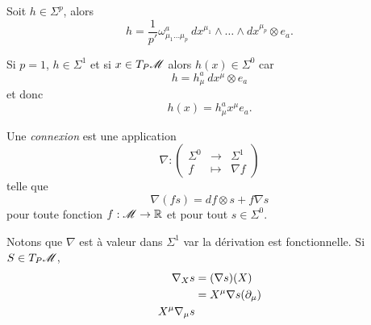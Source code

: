 \documentclass[a4paper,11pt]{report}
\begin{document}
                \begin{exmp}
                    Soit $h\in \Sigma^p$, alors
                    \begin{equation}
                        h = \frac{1}{p'}\omega^a_{\mu_1\dots\mu_p}~dx^{\mu_1}\wedge\dots\wedge dx^{\mu_p}\otimes e_a.
                    \end{equation}
                    
                    Si $p=1$, $h\in\Sigma^1$ et si $x\in T_P\mathscr{M}$ alors $h(x)\in\Sigma^0$ car 
                    \begin{equation}
                        h = h^a_\mu~dx^\mu\otimes e_a
                    \end{equation}
                    et donc
                    \begin{equation}
                        h(x) = h^a_\mu x^\mu e_a.
                    \end{equation}
                \end{exmp}
                
                \begin{defn}
                    Une \textit{connexion} est une application
                    \begin{equation}
                    \nabla:\left(
                    \begin{array}{ccc}
                        \Sigma^0 & \longrightarrow & \Sigma^1 \\
                        f & \longmapsto & \nabla f
                    \end{array}
                    \right)
                    \end{equation}
                    telle que 
                    \begin{equation}
                        \nabla(fs) = df\otimes s+f\nabla s
                    \end{equation}
                    pour toute fonction $f:\mathscr{M}\to\mathbb{R}$ et pour tout $s\in\Sigma^0$.
                \end{defn}
                
                Notons que $\nabla$ est à valeur dans $\Sigma^1$ var la dérivation est fonctionnelle. Si $S\in T_P\mathscr{M}$,
                \begin{align}
                    \nabla_X s &= (\nabla s)(X)\\
                    &= X^\mu\nabla s(\partial_\mu)\\
                    X^\mu\nabla_\mu s
                \end{align}
             
\end{document}

